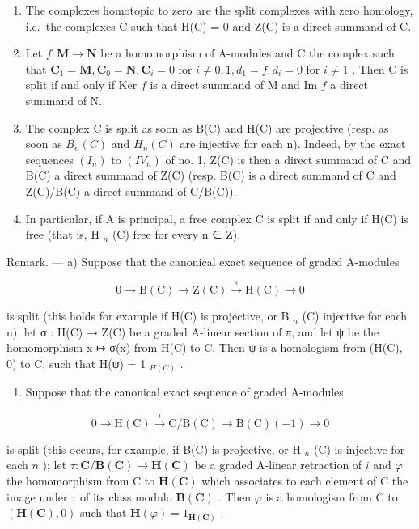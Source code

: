 \begin{enumerate}
\def\labelenumi{\arabic{enumi})}
\setcounter{enumi}{1}
\item
  The complexes homotopic to zero are the split complexes with zero homology, i.e.~the complexes C such that H(C) = 0 and Z(C) is a direct summand of C.
\item
  Let \(f: \mathbf{M} \to \mathbf{N}\) be a homomorphism of A-modules and C the complex such that \(\mathbf{C}_1 = \mathbf{M}, \mathbf{C}_0 = \mathbf{N}, \mathbf{C}_i = 0\) for \(i \neq 0, 1, d_1 = f, d_i = 0\) for \(i \neq 1\) . Then C is split if and only if Ker \(f\) is a direct summand of M and Im \(f\) a direct summand of N.
\item
  The complex C is split as soon as B(C) and H(C) are projective (resp. as soon as \(B_{n}(C)\) and \(H_{n}(C)\) are injective for each n). Indeed, by the exact sequences \((I_{n})\) to \((IV_{n})\) of no. 1, Z(C) is then a direct summand of C and B(C) a direct summand of Z(C) (resp. B(C) is a direct summand of C and Z(C)/B(C) a direct summand of C/B(C)).
\item
  In particular, if A is principal, a free complex C is split if and only if H(C) is free (that is, H \(_{n}\) (C) free for every n ∈ Z).
\end{enumerate}

Remark. --- a) Suppose that the canonical exact sequence of graded A-modules

\[
0 \to \mathrm{B} (\mathrm{C}) \to \mathrm{Z} (\mathrm{C}) \xrightarrow {\pi} \mathrm{H} (\mathrm{C}) \to 0\tag{II}
\]

is split (this holds for example if H(C) is projective, or B \(_{n}\) (C) injective for each n); let σ : H(C) → Z(C) be a graded A-linear section of π, and let ψ be the homomorphism x ↦ σ(x) from H(C) to C. Then ψ is a homologism from (H(C), 0) to C, such that H(ψ) = 1 \(_{H(C)}\) .

\begin{enumerate}
\def\labelenumi{\alph{enumi})}
\setcounter{enumi}{1}
\tightlist
\item
  Suppose that the canonical exact sequence of graded A-modules
\end{enumerate}

\[
0 \rightarrow \mathrm{H} (\mathrm{C}) \stackrel {i} {\rightarrow} \mathrm{C} / \mathrm{B} (\mathrm{C}) \rightarrow \mathrm{B} (\mathrm{C}) (- 1) \rightarrow 0\tag{IV}
\]

is split (this occurs, for example, if B(C) is projective, or H \(_{n}\) (C) is injective for each \(n\) ); let \(\tau: \mathbf{C} / \mathbf{B}(\mathbf{C}) \to \mathbf{H}(\mathbf{C})\) be a graded A-linear retraction of \(i\) and \(\varphi\) the homomorphism from C to \(\mathbf{H}(\mathbf{C})\) which associates to each element of C the image under \(\tau\) of its class modulo \(\mathbf{B}(\mathbf{C})\) . Then \(\varphi\) is a homologism from C to \((\mathbf{H}(\mathbf{C}), 0)\) such that \(\mathbf{H}(\varphi) = 1_{\mathbf{H}(\mathbf{C})}\) .

